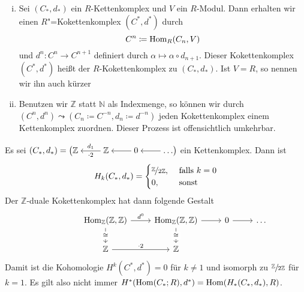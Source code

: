 \begin{bemerkung}[{name=[Dualer Kokettenkomplex und Umwandlung von Kettenkomplexe in Kokettenkomplexe]}] \leavevmode
	\begin{enumerate}[i)]
		\item Sei $(C_*,d_*)$ ein $R$-Kettenkomplex und $V$ ein $R$-Modul. Dann erhalten wir einen $R$"=Kokettenkomplex $(C^*,d^*)$ durch 
		\[
			C^n \coloneqq \operatorname{Hom}_R(C_n,V) 
		\]
		und $d^n \colon C^n \to C^{n+1}$ definiert durch $\alpha \mapsto \alpha \circ d_{n+1}$. Dieser Kokettenkomplex $(C^*,d^*)$ heißt der 
		 $R$-Kokettenkomplex zu $(C_*,d_*)$. Ist $V=R$, so nennen wir ihn auch kürzer 
		\item Benutzen wir $\mathbb{Z}$ statt $\mathbb{N}$ als Indexmenge, so können wir durch $(C^n,d^n) \leadsto (C_n \coloneqq C^{-n}, d_n \coloneqq d^{-n})$ jeden 
		Kokettenkomplex einem Kettenkomplex zuordnen. Dieser Prozess ist offensichtlich umkehrbar.
	\end{enumerate}
\end{bemerkung}

\begin{beispiel}[{name=[Kohomologie ist nicht Dualisieren von Homologie]}]
	Es sei $(C_*,d_*)= \big(\begin{tikzcd}[cramped] \mathbb{Z} & \mathbb{Z} \lar["\cdot 2","d_1"'] & 0 \lar & \ldots \lar \end{tikzcd}\big)$ ein Kettenkomplex. 
	Dann ist
	\[
		H_k(C_*,d_*) = \begin{cases}
			\nicefrac{\mathbb{Z}}{2 \mathbb{Z}}, &\text{ falls } k =0\\
			0 , & \text{ sonst} 
		\end{cases}
	\]
	Der $\mathbb{Z}$-duale Kokettenkomplex hat dann folgende Gestalt
	\[
		\mbox{ }\hspace{1.5cm}\begin{tikzcd}
			 \Hom_{\mathbb{Z}}(\mathbb{Z},\mathbb{Z}) \rar["d^0"] \dar["\cong" description] & \Hom_{\mathbb{Z}}(\mathbb{Z},\mathbb{Z}) \rar \dar["\cong" description] 
			& 0 \rar & \ldots \\
			\mathbb{Z} \rar["\cdot 2"] & \mathbb{Z}
		\end{tikzcd}
	\]
	Damit ist die Kohomologie $H^k(C^*,d^*)=0$ für $k \neq 1$ und isomorph zu $\sfrac{\mathbb{Z}}{2 \mathbb{Z}}$ für $k=1$.
	Es gilt also nicht immer $H^*(\operatorname{Hom}(C_*;R),d^*) =  \operatorname{Hom} (H_*(C_*,d_*),R)$. 
\end{beispiel}

